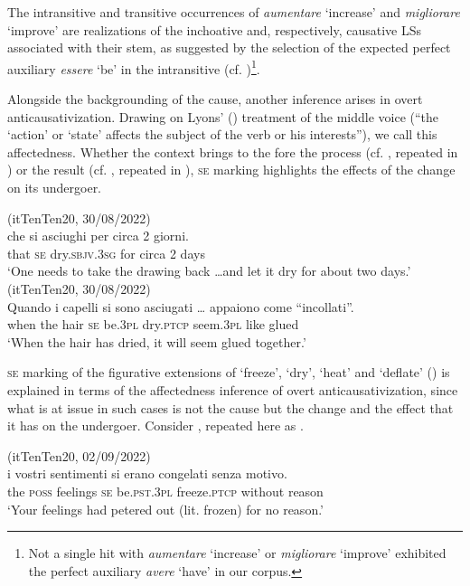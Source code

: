 \documentclass[output=paper,colorlinks,citecolor=brown
]{langscibook}
\begin{document}
The intransitive and transitive occurrences of \textit{aumentare} ‘increase’ and \textit{migliorare} ‘improve’ are realizations of the inchoative and, respectively, causative LSs associated with their stem, as suggested by the selection of the expected perfect auxiliary \textit{essere} ‘be’ in the intransitive (cf. )\footnote{Not a single hit with \textit{aumentare} ‘increase’ or \textit{migliorare} ‘improve’ exhibited the perfect auxiliary \textit{avere} ‘have’ in our corpus.}. 

Alongside the backgrounding of the cause, another inference arises in overt anticausativization. Drawing on Lyons’ (\citeyear[373]{lyons1969introduction}) treatment of the middle voice (“the ‘action’ or ‘state’ affects the subject of the verb or his interests”), we call this affectedness. Whether the context brings to the fore the process (cf. , repeated in ) or the result (cf. , repeated in ), \textsc{se} marking highlights the effects of the change on its undergoer. 

\ea \label{bentley_example_55}(itTenTen20, 30/08/2022)\\
 che		si		asciughi					per		circa	2	giorni. \\
	{} that	\textsc{se}		dry.\textsc{sbjv}.3\textsc{sg}		for		circa	2	days \\
\glt 			‘One needs to take the drawing back \ldots  and let it dry for about two days.’
\ex \label{bentley_example_56} (itTenTen20, 30/08/2022)\\
\gll Quando		i			capelli	si		sono 		asciugati  {\ldots }	appaiono		come “incollati”. \\
	when				the	hair			\textsc{se}		be.3\textsc{pl}	dry.\textsc{ptcp}	{}					seem.3\textsc{pl}		like			glued  \\
\glt 			‘When the hair has dried, it will seem glued together.’
\z

\textsc{se} marking of the figurative extensions of ‘freeze’, ‘dry’, ‘heat’ and ‘deflate’ () is explained in terms of the affectedness inference of overt anticausativization, since what is at issue in such cases is not the cause but the change and the effect that it has on the undergoer. Consider , repeated here as . 

\ea \label{bentley_example_57}(itTenTen20, 02/09/2022)\\
\gll  {\ldots}  i			vostri		sentimenti		si		erano 				congelati		senza			motivo.  \\
	{} 	the	\textsc{poss}			feelings				\textsc{se}		be.\textsc{pst}.3\textsc{pl}	freeze.\textsc{ptcp}	without	reason	 \\
\glt 			‘Your feelings had petered out (lit. frozen) for no reason.’	
\z
\end{document}
